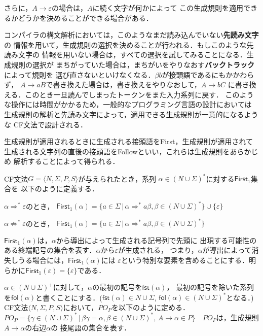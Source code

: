 \documentclass[a4j,dvipdfmx]{jbook}
\begin{document}
さらに，$A\rightarrow\varepsilon$の場合は，$A$に続く文字が何かによって
この生成規則を適用できるかどうかを決めることができる場合がある．

コンパイラの構文解析においては，このようなまだ読み込んでいない{\bf 先読み文字}の
情報を用いて，生成規則の選択を決めることが行われる．もしこのような先読み文字の
情報を用いない場合は，すべての選択を試してみることになる．生成規則の選択が
まちがっていた場合は，まちがいをやりなおす{\bf バックトラック}によって規則を
選び直さないといけなくなる．$\beta b$が接頭語であるにもかかわらず，
$A\rightarrow aB$で書き換えた場合は，書き換えをやりなおして，$A\rightarrow bC$
に書き換える．このとき一旦読んでしまったトークンをまた入力系列に戻す．
このような操作には時間がかかるため，一般的なプログラミング言語の設計においては
生成規則の解析と先読み文字によって，適用できる生成規則が一意的になるような
CF文法で設計される．

生成規則が適用されるときに生成される接頭語をFirst，生成規則が適用されて
生成される文字列の直後の接頭語をFollowといい，これらは生成規則をあらかじめ
解析することによって得られる．

\begin{Def}
  CF文法$G=\langle N,\Sigma,P,S\rangle$が与えられたとき，系列
  $\alpha\in(N\cup\Sigma)^\ast$に対する$\mathsf{First}_1$集合を
  以下のように定義する．
  \begin{list}{}{}
    \item $\alpha\Rightarrow^\ast\varepsilon$のとき，
          $\mathsf{First}_1(\alpha)=\{a\in\Sigma\,|\,
            \alpha\Rightarrow^\ast a\beta,\beta\in(N\cup\Sigma)^\ast\}\cup\{\varepsilon\}$
    \item $\alpha\not\Rightarrow^\ast\varepsilon$のとき，
          $\mathsf{First}_1(\alpha)=\{a\in\Sigma\,|\,
            \alpha\Rightarrow^\ast a\beta,\beta\in(N\cup\Sigma)^\ast\}$
  \end{list}
\end{Def}

$\mathsf{First}_1(\alpha)$は，$\alpha$から導出によって生成される記号列で先頭に
出現する可能性のある終端記号の集合を表す．$\alpha$から$\varepsilon$が生成される，
つまり，$\alpha$が導出によって消失しうる場合には，$\mathsf{First}_1(\alpha)$には
$\varepsilon$という特別な要素を含めることにする．明らかに$\mathsf{First}_1(\varepsilon)
  =\{\varepsilon\}$である．

$\alpha\in(N\cup\Sigma)^+$に対して，$\alpha$の最初の記号を$\mathsf{fst}(\alpha)$，
最初の記号を除いた系列を$\mathsf{fol}(\alpha)$と書くことにする．($\mathsf{fst}(\alpha)\in
  N\cup\Sigma$, $\mathsf{fol}(\alpha)\in(N\cup\Sigma)^\ast$となる．)
CF文法$\langle N,\Sigma,P,S\rangle$において，$PO_P$を以下のように定める．
$PO_P=\{\gamma\in(N\cup\Sigma)^\ast\,|\,\beta\gamma=\alpha, \beta\in(N\cup\Sigma)^\ast,\,
  A\rightarrow\alpha\in P\}$　$PO_P$は，生成規則$A\rightarrow\alpha$の右辺$\alpha$の
接尾語の集合を表す．
\end{document}
